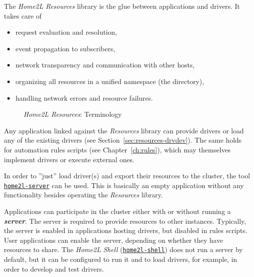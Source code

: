 \documentclass[12pt,english,parskip=half,headheight=19pt]{scrreprt}
\newcommand{\figsvg}[2][]{}            %
\newcommand{\figsvg}[2][]{\href{#2}{}} %
\newcommand{\idx}[1]{#1\index{#1}}
\newcommand{\reftool}[1]{\hyperref[tool:#1]{\texttt{\idx{#1}}}}
\begin{document}
The \textit{Home2L Resources} library is the glue between applications and drivers. It takes care of
\begin{itemize}
  \item request evaluation and resolution,
  \item event propagation to subscribers,
  \item network transparency and communication with other hosts,
  \item organizing all resources in a unified namespace (the directory),
  \item handling network errors and resource failures.
\end{itemize}

\begin{figure}[ht]
  \centering
  \figsvg[width=\linewidth]{figs/resources-terminology.svg}
  \caption[l]{\textit{Home2L Resources}: Terminology}
  \label{fig:resources-terminology}
\end{figure}

Any application linked against the \textit{Resources} library can provide drivers or load any of the existing drivers (see Section~\ref{sec:resources-drvdev}). The same holds for automation rules scripts (see Chapter~\ref{ch:rules}), which may themselves implement drivers or execute external ones.

In order to ''just'' load driver(s) and export their resources to the cluster, the tool \reftool{home2l-server} can be used. This is basically an empty application without any functionality besides operating the \textit{Resources} library.

Applications can participate in the cluster either with or without running a \textbf{\textit{server}}. The server is required to provide resources to other instances. Typically, the server is enabled in applications hosting drivers, but disabled in rules scripts. User applications can enable the server, depending on whether they have resources to share. The \textit{Home2L Shell} (\reftool{home2l-shell}) does not run a server by default, but it can be configured to run it and to load drivers, for example, in order to develop and test drivers.
\end{document}
